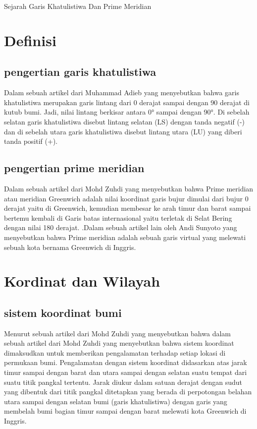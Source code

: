    
  
Sejarah Garis Khatulistiwa Dan Prime Meridian


														   
\section {Definisi}

\subsection{pengertian garis khatulistiwa}	

	Dalam sebuah artikel dari Muhammad Adieb yang menyebutkan bahwa garis khatulistiwa merupakan garis lintang dari 0 derajat sampai dengan 90 derajat di kutub bumi. Jadi, nilai lintang berkisar antara 0° sampai dengan 90°. Di sebelah selatan garis khatulistiwa disebut lintang selatan (LS) dengan tanda negatif (-) dan di sebelah utara garis khatulistiwa disebut lintang utara (LU) yang diberi tanda positif (+)\cite{adieb2014studi}.

\subsection{pengertian prime meridian}
	
	Dalam sebuah artikel dari Mohd Zuhdi yang menyebutkan bahwa Prime meridian atau meridian Greenwich adalah nilai koordinat garis bujur dimulai dari bujur 0 derajat yaitu di Greenwich, kemudian membesar ke arah timur dan barat sampai bertemu kembali di Garis batas internasional yaitu terletak di Selat Bering dengan nilai 180 derajat. \cite {zuhdi2012sistem}.Dalam sebuah artikel lain oleh Andi Sunyoto yang menyebutkan bahwa Prime meridian adalah sebuah garis virtual yang melewati sebuah kota 
bernama Greenwich di Inggris\cite{sunyoto2009api}.

\section {Kordinat dan Wilayah}

\subsection{sistem koordinat bumi}
	

	Menurut sebuah artikel dari Mohd Zuhdi yang menyebutkan bahwa dalam sebuah artikel dari Mohd Zuhdi yang menyebutkan bahwa sistem koordinat dimaksudkan 
untuk memberikan pengalamatan terhadap setiap lokasi di permukaan bumi. Pengalamatan dengan sistem koordinat didasarkan atas jarak timur sampai dengan barat 
dan utara sampai dengan selatan suatu tempat dari suatu titik pangkal tertentu. Jarak diukur dalam satuan derajat dengan sudut yang dibentuk dari titik 
pangkal ditetapkan yang berada di perpotongan belahan utara sampai dengan selatan bumi (garis khatulistiwa) dengan garis yang membelah bumi bagian timur sampai 
dengan barat melewati kota Greenwich di Inggris.


